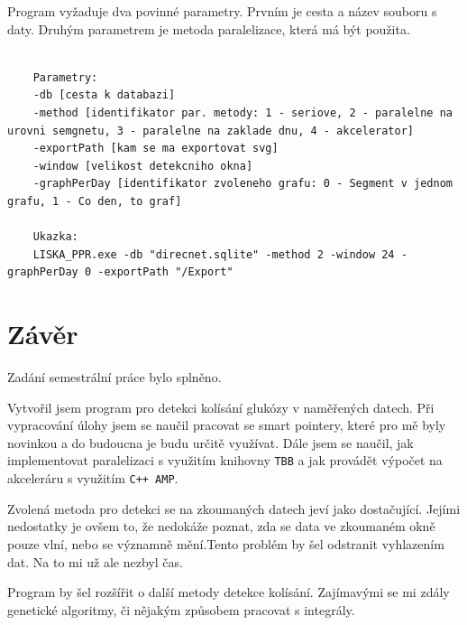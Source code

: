 \documentclass{article}
\begin{document}
	Program vyžaduje dva povinné parametry. Prvním je cesta a název souboru s daty. Druhým parametrem je metoda paralelizace, která má být použita. 
	
	\vspace{0.4cm}
	\noindent
	\begin{minipage}{\linewidth}
	\begin{lstlisting}
	
	Parametry:
	-db [cesta k databazi]
	-method [identifikator par. metody: 1 - seriove, 2 - paralelne na urovni semgnetu, 3 - paralelne na zaklade dnu, 4 - akcelerator]
	-exportPath [kam se ma exportovat svg]
	-window [velikost detekcniho okna]
	-graphPerDay [identifikator zvoleneho grafu: 0 - Segment v jednom grafu, 1 - Co den, to graf]
	
	Ukazka:
	LISKA_PPR.exe -db "direcnet.sqlite" -method 2 -window 24 -graphPerDay 0 -exportPath "/Export"
	\end{lstlisting} 
	\end{minipage}
	
	\section{Závěr} %
	Zadání semestrální práce bylo splněno.
	
	Vytvořil jsem program pro detekci kolísání glukózy v naměřených datech.
	Při vypracování úlohy jsem se naučil pracovat se smart pointery, které pro mě byly novinkou a do budoucna je budu určitě využívat. Dále jsem se naučil, jak implementovat paralelizaci s využitím knihovny \texttt{TBB} a jak provádět výpočet na akceleráru s využitím \texttt{C++ AMP}.
	
	Zvolená metoda pro detekci se na zkoumaných datech jeví jako dostačující. Jejími nedostatky je ovšem to, že nedokáže poznat, zda se data ve zkoumaném okně pouze vlní, nebo se významně mění.Tento problém by šel odstranit vyhlazením dat. Na to mi už ale nezbyl čas.
	
	Program by šel rozšířit o další metody detekce kolísání. Zajímavými se mi zdály genetické algoritmy, či nějakým způsobem pracovat s integrály.
	
	
	 
\end{document}
